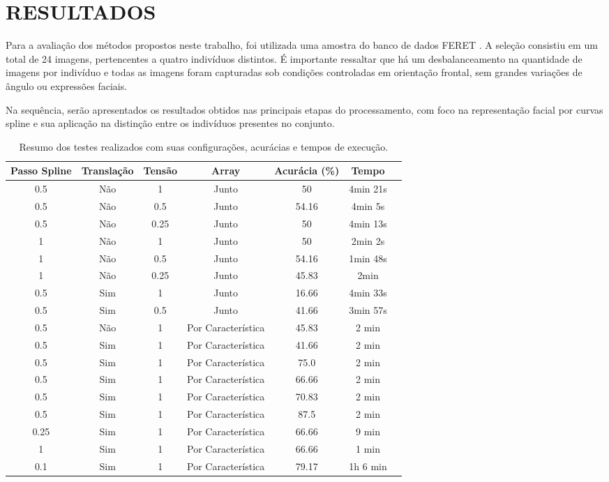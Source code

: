 \chapter{RESULTADOS} \label{cha:resultados}

Para a avaliação dos métodos propostos neste trabalho, foi utilizada uma amostra do banco de dados FERET \cite{FERET1,FERET2}. A seleção consistiu em um total de 24 imagens, pertencentes a quatro indivíduos distintos. É importante ressaltar que há um desbalanceamento na quantidade de imagens por indivíduo e todas as imagens foram capturadas sob condições controladas em orientação frontal, sem grandes variações de ângulo ou expressões faciais.

Na sequência, serão apresentados os resultados obtidos nas principais etapas do processamento, com foco na representação facial por curvas spline e sua aplicação na distinção entre os indivíduos presentes no conjunto.

\begin{table}[h!]
    \centering
    \begin{tabular}{|c|c|c|c|c|c|c|}
    \hline
    \textbf{Passo Spline} & \textbf{Translação} & \textbf{Tensão} & \textbf{Array} & \textbf{Acurácia (\%)} & \textbf{Tempo} \\
    \hline
    0.5 & Não & 1 & Junto & 50 & 4min 21s\\
    0.5 & Não & 0.5 & Junto & 54.16 & 4min 5s\\
    0.5 & Não & 0.25 & Junto & 50 & 4min 13s\\
    1 & Não & 1 & Junto & 50 & 2min 2s\\
    1 & Não & 0.5 & Junto & 54.16 & 1min 48s\\
    1 & Não & 0.25 & Junto & 45.83 & 2min\\
    0.5 & Sim & 1 & Junto & 16.66 & 4min 33s \\
    0.5 & Sim & 0.5 & Junto & 41.66 & 3min 57s \\
    0.5 & Não & 1 & Por Característica & 45.83 & 2 min \\
    0.5 & Sim & 1 & Por Característica & 41.66 & 2 min \\
    0.5 & Sim & 1 & Por Característica & 75.0 & 2 min \\
    0.5 & Sim & 1 & Por Característica & 66.66 & 2 min \\
    0.5 & Sim & 1 & Por Característica & 70.83 & 2 min \\
    0.5 & Sim & 1 & Por Característica & 87.5 & 2 min \\
    0.25 & Sim & 1 & Por Característica & 66.66 & 9 min \\
    1 & Sim & 1 & Por Característica & 66.66 & 1 min \\
    0.1 & Sim & 1 & Por Característica & 79.17 & 1h 6 min \\
    \hline
    \end{tabular}
    \caption{Resumo dos testes realizados com suas configurações, acurácias e tempos de execução.}
\end{table}
